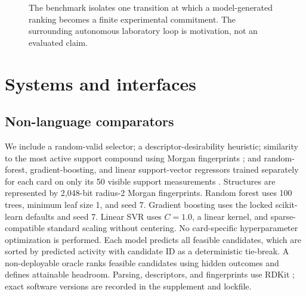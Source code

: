 \documentclass[10pt,a4paper]{article}
\begin{document}
\begin{figure}[H]
\centering
{}
\caption{The benchmark isolates one transition at which a model-generated
ranking becomes a finite experimental commitment. The surrounding autonomous
laboratory loop is motivation, not an evaluated claim.}
\label{fig:action_boundary}
\end{figure}

\section{Systems and interfaces}

\subsection{Non-language comparators}

We include a random-valid selector; a descriptor-desirability heuristic;
similarity to the most active support compound using Morgan fingerprints
\cite{rogers2010ecfp}; and random-forest, gradient-boosting, and linear
support-vector regressors trained separately for each card on only its 50
visible support measurements \cite{pedregosa2011sklearn,tropsha2010qsar}.
Structures are represented by 2,048-bit radius-2 Morgan fingerprints. Random
forest uses 100 trees, minimum leaf size 1, and seed 7. Gradient boosting uses
the locked scikit-learn defaults and seed 7. Linear SVR uses $C=1.0$, a linear
kernel, and sparse-compatible standard scaling without centering. No
card-specific hyperparameter optimization is performed. Each model predicts
all feasible candidates, which are sorted by predicted activity with candidate
ID as a deterministic tie-break. A non-deployable oracle ranks feasible
candidates using hidden outcomes and defines attainable headroom. Parsing,
descriptors, and fingerprints use RDKit \cite{rdkit2024}; exact software
versions are recorded in the supplement and lockfile.
\end{document}
